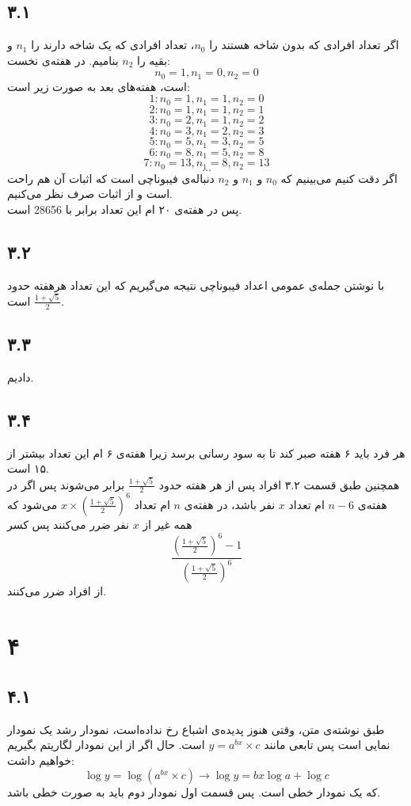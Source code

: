 \documentclass[12pt,a4paper]{article}
\begin{document}
\subsection*{۳.۱}
اگر تعداد افرادی که بدون شاخه هستند را $n_0$، تعداد افرادی که یک شاخه دارند را $n_1$ و بقیه را $n_2$ بنامیم. در هفته‌ی نخست:
$$
n_0 = 1, n_1 = 0, n_2 = 0
$$
است، هفته‌‌های بعد به صورت زیر است:
$$
1: n_0 = 1, n_1 = 1, n_2 = 0$$$$
2: n_0 = 1, n_1 = 1, n_2 = 1$$$$
3: n_0 = 2, n_1 = 1, n_2 = 2$$$$
4: n_0 = 3, n_1 = 2, n_2 = 3$$$$
5: n_0 = 5, n_1 = 3, n_2 = 5$$$$
6: n_0 = 8, n_1 = 5, n_2 = 8$$$$
7: n_0 = 13, n_1 = 8, n_2 = 13$$$$
...
$$
اگر دقت کنیم می‌بینیم که $n_0$ و $n_1$ و $n_2$ دنباله‌ی فیبوناچی است که اثبات آن هم راحت است و از اثبات صرف نظر می‌کنیم.
\\
پس در هفته‌ی ۲۰ ام این تعداد برابر با 28656 است.
\subsection*{۳.۲}
با نوشتن جمله‌ی عمومی اعداد فیبوناچی نتیجه می‌گیریم که این تعداد هرهفته حدود
$\frac{1+\sqrt{5}}{2}$
است.
\subsection*{۳.۳}
دادیم.
\subsection*{۳.۴}
هر فرد باید ۶ هفته صبر کند تا به سود رسانی برسد زیرا هفته‌ی ۶ ام این تعداد بیشتر از ۱۵ است.
\\
همچنین طبق قسمت ۳.۲ افراد پس از هر هفته حدود
$\frac{1+\sqrt{5}}{2}$
برابر می‌شوند پس اگر در هفته‌ی 
$n-6$
ام تعداد $x$ نفر باشد، در هفته‌ی $n$ ام تعداد 
$x \times (\frac{1+\sqrt{5}}{2})^6$
می‌شود که همه غیر از $x$ نفر ضرر می‌کنند پس کسر
$$
\frac{(\frac{1+\sqrt{5}}{2})^6 - 1}{(\frac{1+\sqrt{5}}{2})^6}
$$
از افراد ضرر می‌کنند.
\section*{۴}
\subsection*{۴.۱}
طبق نوشته‌ی متن، وقتی هنوز پدیده‌ی اشباع رخ نداده‌است، نمودار رشد یک نمودار نمایی است پس تابعی مانند 
$y = a^{bx}\times c$
است.
حال اگر از این نمودار لگاریتم بگیریم خواهیم داشت:
$$ \log y = \log (a^{bx}\times c) \rightarrow  \log y = bx \log a + \log c$$
که یک نمودار خطی است.  پس قسمت اول نمودار دوم باید به صورت خطی باشد.
\end{document}
